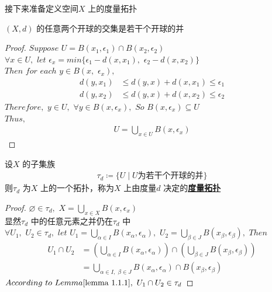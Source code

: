 	接下来准备定义空间$X$ 上的度量拓扑
	\begin{lemma}\label{lemma 1.1.1}
		$(X , d)$ 的任意两个开球的交集是若干个开球的并
	\end{lemma}
	
	\begin{proof}
		$Suppose \,\, U = B(x_1 , \epsilon_1) \cap B(x_2 , \epsilon_2)$\\
		$\forall x \in U , \,\, let \,\, \epsilon_{x} = min\{ \epsilon_1 - d(x , x_1) , \,\, \epsilon_2 - d(x , x_2) \}$\\
		$Then \,\, for \,\, each \,\, y \in B(x , \,\, \epsilon_x) ,$
		\begin{align}
			d(y , x_1) &\leq d(y , x) + d(x , x_1) \leq \epsilon_1\\
			d(y , x_2) &\leq d(y , x) + d(x , x_2) \leq \epsilon_2
		\end{align}
		$Therefore , \,\, y \in U , \,\, \forall y \in B(x , \epsilon_x) , \,\, So \,\, B(x , \epsilon_x) \subseteq U$\\
		$Thus , $
		\begin{align}
			U = \bigcup_{x \in U}{B(x , \epsilon_x)}
		\end{align}
	\end{proof}

	\begin{proposition}\label{prop 1.1.1}
		设$X$ 的子集族
		\begin{align}
			\tau_d \coloneqq \{ U \mid U \text{为若干个开球的并} \}
		\end{align}
		则$\tau_d$ 为$X$ 上的一个拓扑，称为$X$ 上由度量$d$ 决定的\underline{\textbf{度量拓扑}}
	\end{proposition}

	\begin{proof}
		$\varnothing \in \tau_d , \,\, X = \bigcup_{x \in X}{B(x , \epsilon_x)}$\\
		显然$\tau_d$ 中的任意元素之并仍在$\tau_d$ 中\\
		$\forall U_1 , \,\, U_2 \in \tau_d , \,\, let \,\, U_1 = \bigcup_{\alpha \in I}{B(x_{\alpha} , \epsilon_{\alpha})} , \,\, U_2 = \bigcup_{\beta \in J}{B(x_{\beta} , \epsilon_{\beta})} , \,\, Then$
		\begin{align}
			U_1 \cap U_2 
			&= (\bigcup_{\alpha \in I}{B(x_{\alpha} , \epsilon_{\alpha})}) \cap 
			(\bigcup_{\beta \in J}{B(x_{\beta} , \epsilon_{\beta})})\\
			&= \bigcup_{\alpha \in I , \,\, \beta \in J}{B(x_{\alpha} , \epsilon_{\alpha}) \cap B(x_{\beta} , \epsilon_{\beta})}
		\end{align}
		$According \,\, to \,\, Lemma\ref{lemma 1.1.1} , \,\, U_1 \cap U_2 \in \tau_d$
	\end{proof}

